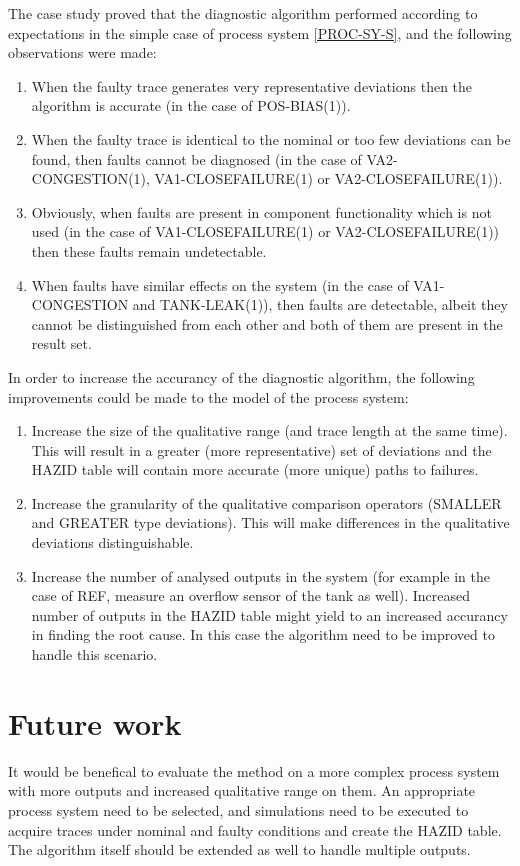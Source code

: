 \documentclass[conference]{IEEEtran}
\begin{document}
The case study proved that the diagnostic algorithm performed according to expectations in the simple case of process system \ref{PROC-SY-S}, and the following observations were made:

\begin{enumerate}
\item When the faulty trace generates very representative deviations then the algorithm is accurate (in the case of POS-BIAS(1)).
\item When the faulty trace is identical to the nominal or too few deviations can be found, then faults cannot be diagnosed (in the case of VA2-CONGESTION(1), VA1-CLOSEFAILURE(1) or VA2-CLOSEFAILURE(1)).
\item Obviously, when faults are present in component functionality which is not used (in the case of VA1-CLOSEFAILURE(1) or VA2-CLOSEFAILURE(1)) then these faults remain undetectable.
\item When faults have similar effects on the system (in the case of VA1-CONGESTION and TANK-LEAK(1)), then faults are detectable, albeit they cannot be distinguished from each other and both of them are present in the result set.
\end{enumerate}

In order to increase the accurancy of the diagnostic algorithm, the following improvements could be made to the model of the process system:
\begin{enumerate}
\item Increase the size of the qualitative range (and trace length at the same time). This will result in a greater (more representative) set of deviations and the HAZID table will contain more accurate (more unique) paths to failures.
\item Increase the granularity of the qualitative comparison operators (SMALLER and GREATER type deviations). This will make differences in the qualitative deviations distinguishable.
\item Increase the number of analysed outputs in the system (for example in the case of REF, measure an overflow sensor of the tank as well). Increased number of outputs in the HAZID table might yield to an increased accurancy in finding the root cause. In this case the algorithm need to be improved to handle this scenario.
\end{enumerate}

\section {Future work}
It would be benefical to evaluate the method on a more complex process system with more outputs and increased qualitative range on them. An appropriate process system need to be selected, and simulations need to be executed to acquire traces under nominal and faulty conditions and create the HAZID table. The algorithm itself should be extended as well to handle multiple outputs.
\end{document}
